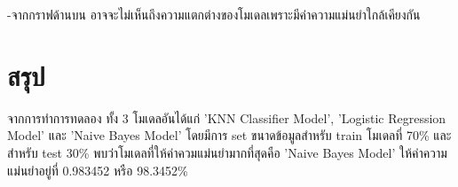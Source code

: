 \documentclass[11pt]{article}
\begin{document}
    -จากกราฟด้านบน
อาจจะไม่เห็นถึงความแตกต่างของโมเดลเพราะมีค่าความแม่นยำใกล้เคียงกัน

    \section{สรุป}\label{uxe2auxe23uxe1b}

    จากการทำการทดลอง ทั้ง 3 โมเดลอันได้แก่ 'KNN Classifier Model', 'Logistic
Regression Model' และ 'Naive Bayes Model' โดยมีการ set ขนาดข้อมูลสำหรับ
train โมเดลที่ 70\% และ สำหรับ test 30\%
พบว่าโมเดลที่ให้ค่าควมแม่นยำมากที่สุดคือ 'Naive Bayes Model'
ให้ค่าความแม่นยำอยู่ที่ 0.983452 หรือ 98.3452\%


    
    
    
    
\end{document}
